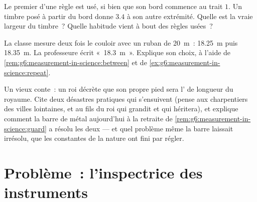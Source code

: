 \begin{exercise}[$\star\star$]\label{exo:g6:measurement-in-science:10}
Le premier  d'une règle est usé, si bien que son bord
commence au trait $1$. Un timbre posé à partir du bord donne $3.4$ à
son autre extrémité. Quelle est la vraie largeur du timbre~? Quelle
habitude vient à bout des règles usées~?
\end{exercise}

\begin{exercise}[$\star\star$]\label{exo:g6:measurement-in-science:11}
La classe mesure deux fois le couloir avec un ruban de
\qty{20}{m}~: \qty{18.25}{m} puis \qty{18.35}{m}. La professeure
écrit «~\qty{18.3}{m}~». Explique son choix, à l'aide de
\cref{rem:g6:measurement-in-science:between} et de
\cref{ex:g6:measurement-in-science:repeat}.
\end{exercise}

\begin{exercise}[$\star\star\star$]\label{exo:g6:measurement-in-science:12}
Un vieux conte~: un roi décrète que son propre pied sera l' de
longueur du royaume. Cite deux désastres pratiques qui s'ensuivent
(pense aux charpentiers des villes lointaines, et au fils du roi qui
grandit et qui héritera), et explique comment la barre de métal
aujourd'hui à la retraite de
\cref{rem:g6:measurement-in-science:guard} a résolu les deux --- et
quel problème même la barre laissait irrésolu, que les constantes de
la nature ont fini par régler.
\end{exercise}

\section{Problème~: l'inspectrice des instruments}

